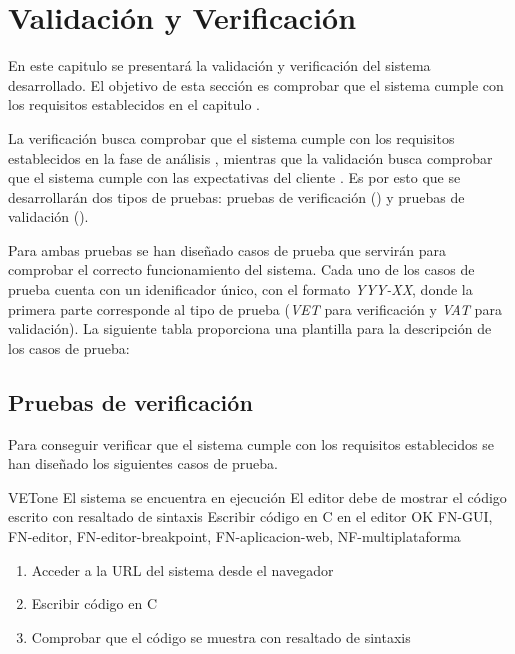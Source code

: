 \chapter{Validación y Verificación}\label{chap:validacion}

En este capitulo se presentará la validación y verificación del sistema desarrollado. El objetivo de esta sección es comprobar que el sistema cumple con los requisitos establecidos en el capitulo . 

La verificación busca comprobar que el sistema cumple con los requisitos establecidos en la fase de análisis \cite{IEEE-Validation-Verification}, mientras que la validación busca comprobar que el sistema cumple con las expectativas del cliente \cite{IEEE-Validation-Verification}. 
Es por esto que se desarrollarán dos tipos de pruebas: pruebas de verificación () y pruebas de validación (). 

Para ambas pruebas se han diseñado casos de prueba que servirán para comprobar el correcto funcionamiento del sistema. Cada uno de los casos de prueba cuenta con un idenificador único, con el formato \textit{YYY-XX}, donde la primera parte corresponde al tipo de prueba (\textit{VET} para verificación y \textit{VAT} para validación). La siguiente tabla proporciona una plantilla para la descripción de los casos de prueba:

\printtesttemplate

\section{Pruebas de verificación}\label{sec:verificacion}

Para conseguir verificar que el sistema cumple con los requisitos establecidos se han diseñado los siguientes casos de prueba.

    \begin{testCase}{VET}{one}
    {El sistema se encuentra en ejecución}
    {El editor debe de mostrar el código escrito con resaltado de sintaxis}
    {Escribir código en C en el editor}
    {OK}
    {FN-GUI, FN-editor, FN-editor-breakpoint, FN-aplicacion-web, NF-multiplataforma}
    \begin{enumerate}
        \item Acceder a la URL del sistema desde el navegador
        \item Escribir código en C
        \item Comprobar que el código se muestra con resaltado de sintaxis
    \end{enumerate}
    \end{testCase}

